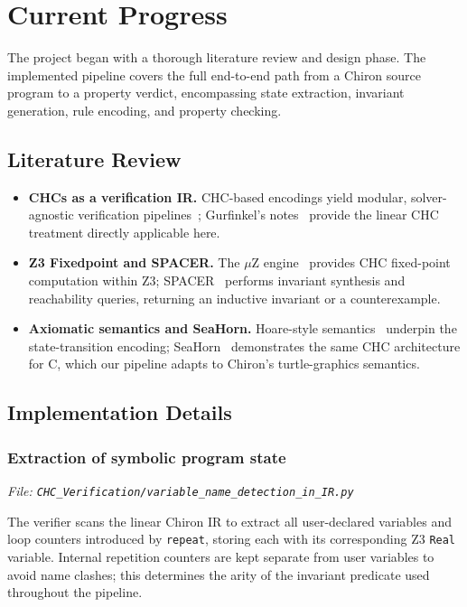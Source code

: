 \section*{Current Progress}
The project began with a thorough literature review and design phase. The implemented pipeline covers the full end-to-end path from a Chiron source program to a property verdict, encompassing state extraction, invariant generation, rule encoding, and property checking.

\subsection*{Literature Review}

\begin{itemize}[leftmargin=1.5em]
    \item \textbf{CHCs as a verification IR.} CHC-based encodings yield modular, solver-agnostic verification pipelines~\cite{bjorner2015horn, rybalchenko2011constraint}; Gurfinkel's notes~\cite{gurfinkel_chc_lecture} provide the linear CHC treatment directly applicable here.
    \item \textbf{Z3 Fixedpoint and SPACER.} The $\mu$Z engine~\cite{fixed-point-engine} provides CHC fixed-point computation within Z3; SPACER~\cite{z3guide_spacer} performs invariant synthesis and reachability queries, returning an inductive invariant or a counterexample.
    \item \textbf{Axiomatic semantics and SeaHorn.} Hoare-style semantics~\cite{utexas_axiomatic_semantics} underpin the state-transition encoding; SeaHorn~\cite{gurfinkel2015seahorn} demonstrates the same CHC architecture for C, which our pipeline adapts to Chiron's turtle-graphics semantics. 
\end{itemize}

\subsection*{Implementation Details}

\subsubsection*{Extraction of symbolic program state}
\noindent\textit{\small File: \texttt{CHC\_Verification/variable\_name\_detection\_in\_IR.py}}

The verifier scans the linear Chiron IR to extract all user-declared variables and loop counters introduced by \texttt{repeat}, storing each with its corresponding Z3 \texttt{Real} variable. Internal repetition counters are kept separate from user variables to avoid name clashes; this determines the arity of the invariant predicate used throughout the pipeline.

